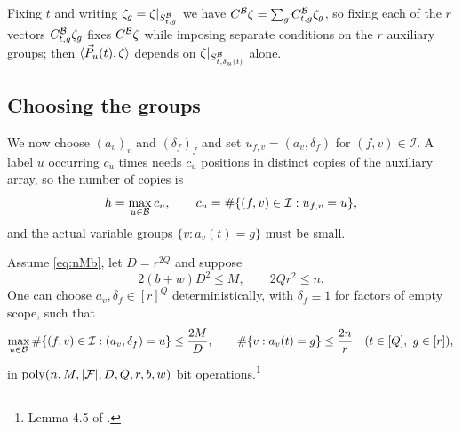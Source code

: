 Fixing $t$ and writing $\zeta_g=\zeta|_{S^{\mathcal{B}}_{t,g}}$ we have
$C^{\mathcal{B}}\zeta=\sum_gC^{\mathcal{B}}_{t,g}\zeta_g$, so fixing each of the $r$ vectors
$C^{\mathcal{B}}_{t,g}\zeta_g$ fixes $C^{\mathcal{B}}\zeta$ while imposing separate conditions on
the $r$ auxiliary groups; then $\langle \vec{P}_u(t),\zeta\rangle$ depends on
$\zeta|_{S^{\mathcal{B}}_{t,\delta_u(t)}}$ alone.

\subsection{Choosing the groups}
We now choose $(a_v)_v$ and $(\delta_f)_f$ and set $u_{f,v}=(a_v,\delta_f)$ for
$(f,v)\in\mathcal I$. A label $u$ occurring $c_u$ times needs $c_u$ positions in
distinct copies of the auxiliary array, so the number of copies is
\begin{equation}\label{eq:h}
  h=\max_{u\in\mathcal{B}}c_u,\qquad c_u=\#\{(f,v)\in\mathcal I:u_{f,v}=u\},
\end{equation}
and the actual variable groups $\{v:a_v(t)=g\}$ must be small.

\begin{lemma}\label{lem:labels}
Assume \eqref{eq:nMb}, let $D=r^{2Q}$ and suppose
\begin{equation}\label{eq:balance}
  2(b+w)D^2\le M,\qquad 2Qr^2\le n .
\end{equation}
One can choose $a_v,\delta_f\in[r]^{Q}$ deterministically, with
$\delta_f\equiv1$ for factors of empty scope, such that
\[
  \max_{u\in\mathcal{B}}\#\{(f,v)\in\mathcal I:(a_v,\delta_f)=u\}\le\frac{2M}D,\qquad
  \#\{v:a_v(t)=g\}\le\frac{2n}r\quad(t\in[Q],\ g\in[r]),
\]
in $\operatorname{poly}(n,M,|\mathcal{F}|,D,Q,r,b,w)$ bit operations.\footnote{Lemma 4.5 of \cite{OAI26}.}
\end{lemma}

